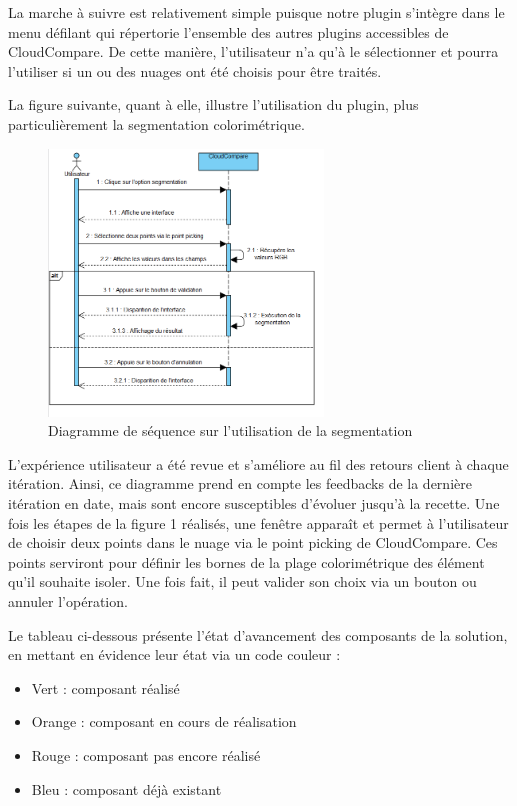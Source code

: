 \documentclass[12pt,titlepage,french]{article}
\begin{document}
La marche à suivre est relativement simple puisque notre plugin s'intègre dans le menu défilant qui répertorie l'ensemble des autres plugins accessibles de CloudCompare. De cette manière, l'utilisateur n'a qu'à le sélectionner et pourra l'utiliser si un ou des nuages ont été choisis pour être traités. \newline

La figure suivante, quant à elle, illustre l'utilisation du plugin, plus particulièrement la segmentation colorimétrique.

\begin{figure}[H]
\center
  \includegraphics[width=0.65\textwidth]{./img/sequDiagrSegmentation.PNG}
  \caption{\label{} Diagramme de séquence sur l'utilisation de la segmentation}
\end{figure}

L'expérience utilisateur a été revue et s'améliore au fil des retours client à chaque itération. Ainsi, ce diagramme prend en compte les feedbacks de la dernière itération en date, mais sont encore susceptibles d'évoluer jusqu'à la recette. Une fois les étapes de la figure 1 réalisés, une fenêtre apparaît et permet à l'utilisateur de choisir deux points dans le nuage via le point picking de CloudCompare. Ces points serviront pour définir les bornes de la plage colorimétrique des élément qu'il souhaite isoler. Une fois fait, il peut valider son choix via un bouton ou annuler l'opération. \newline

Le tableau ci-dessous présente l'état d'avancement des composants de la solution, en mettant en évidence leur état via un code couleur :
\begin{itemize}
    \item Vert : composant réalisé
    \item Orange : composant en cours de réalisation
    \item Rouge : composant pas encore réalisé
    \item Bleu : composant déjà existant
\end{itemize}
\end{document}
